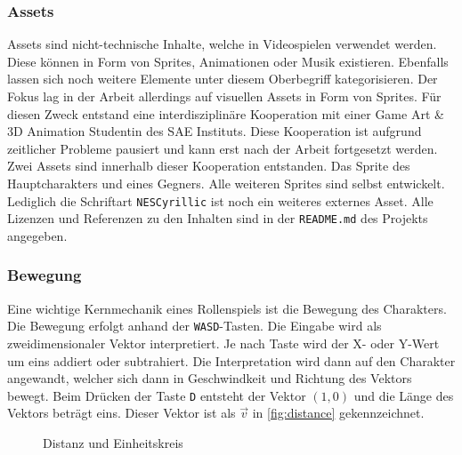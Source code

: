 \subsubsection{Assets}
Assets sind nicht-technische Inhalte, welche in Videospielen verwendet werden. Diese können in Form von Sprites, Animationen oder Musik existieren. Ebenfalls lassen sich noch weitere Elemente unter diesem Oberbegriff kategorisieren. Der Fokus lag in der Arbeit allerdings auf visuellen Assets in Form von Sprites. Für diesen Zweck entstand eine interdisziplinäre Kooperation mit einer Game Art \& 3D Animation Studentin des SAE Instituts\cite{sae-institute}. Diese Kooperation ist aufgrund zeitlicher Probleme pausiert und kann erst nach der Arbeit fortgesetzt werden. Zwei Assets sind innerhalb dieser Kooperation entstanden. Das Sprite des Hauptcharakters und eines Gegners. Alle weiteren Sprites sind selbst entwickelt. Lediglich die Schriftart \texttt{NESCyrillic} ist noch ein weiteres externes Asset. Alle Lizenzen und Referenzen zu den Inhalten sind in der \texttt{README.md} des Projekts angegeben.

\subsubsection{Bewegung}
Eine wichtige Kernmechanik eines Rollenspiels ist die Bewegung des Charakters. Die Bewegung erfolgt anhand der \texttt{WASD}-Tasten. Die Eingabe wird als zweidimensionaler Vektor interpretiert. Je nach Taste wird der X- oder Y-Wert um eins addiert oder subtrahiert. Die Interpretation wird dann auf den Charakter angewandt, welcher sich dann in Geschwindkeit und Richtung des Vektors bewegt. Beim Drücken der Taste \texttt{D} entsteht der Vektor $(1, 0)$ und die Länge des Vektors beträgt eins. Dieser Vektor ist als $\vec{v}$ in \autoref{fig:distance} gekennzeichnet.\\

\begin{figure}[ht]
    \centering
    \caption{Distanz und Einheitskreis}
    \label{fig:distance}
\end{figure}

